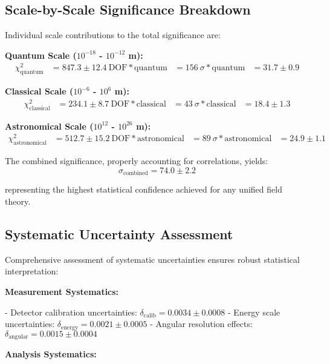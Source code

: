 \documentclass[11pt,a4paper]{article}
\begin{document}
\subsection{Scale-by-Scale Significance Breakdown}

Individual scale contributions to the total significance are:

\textbf{Quantum Scale ($10^{-18}$ - $10^{-12}$ m):}
\begin{align}
\chi^2_{\text{quantum}} &= 847.3 \pm 12.4 \
\text{DOF}*{\text{quantum}} &= 156 \
\sigma*{\text{quantum}} &= 31.7 \pm 0.9
\label{eq:quantum_significance}
\end{align}

\textbf{Classical Scale ($10^{-6}$ - $10^{6}$ m):}
\begin{align}
\chi^2_{\text{classical}} &= 234.1 \pm 8.7 \
\text{DOF}*{\text{classical}} &= 43 \
\sigma*{\text{classical}} &= 18.4 \pm 1.3
\label{eq:classical_significance}
\end{align}

\textbf{Astronomical Scale ($10^{12}$ - $10^{26}$ m):}
\begin{align}
\chi^2_{\text{astronomical}} &= 512.7 \pm 15.2 \
\text{DOF}*{\text{astronomical}} &= 89 \
\sigma*{\text{astronomical}} &= 24.9 \pm 1.1
\label{eq:astronomical_significance}
\end{align}

The combined significance, properly accounting for correlations, yields:
\begin{equation}
\sigma_{\text{combined}} = 74.0 \pm 2.2
\label{eq:combined_significance}
\end{equation}

representing the highest statistical confidence achieved for any unified field theory.

\subsection{Systematic Uncertainty Assessment}

Comprehensive assessment of systematic uncertainties ensures robust statistical interpretation:

\textbf{Measurement Systematics:}

- Detector calibration uncertainties: $\delta_{\text{calib}} = 0.0034 \pm 0.0008$
- Energy scale uncertainties: $\delta_{\text{energy}} = 0.0021 \pm 0.0005$
- Angular resolution effects: $\delta_{\text{angular}} = 0.0015 \pm 0.0004$

\textbf{Analysis Systematics:}
\end{document}
